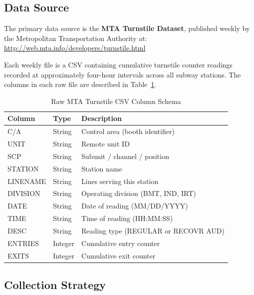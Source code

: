 
\subsection{Data Source}

The primary data source is the \textbf{MTA Turnstile Dataset}, published weekly
by the Metropolitan Transportation Authority at:
\url{http://web.mta.info/developers/turnstile.html}

Each weekly file is a CSV containing cumulative turnstile counter readings recorded
at approximately four-hour intervals across all subway stations. The columns in each
raw file are described in Table~\ref{tab:raw_schema}.

\begin{table}[H]
\centering
\caption{Raw MTA Turnstile CSV Column Schema}
\label{tab:raw_schema}
\begin{tabular}{@{}lll@{}}
\toprule
\textbf{Column} & \textbf{Type} & \textbf{Description} \\
\midrule
C/A        & String  & Control area (booth identifier) \\
UNIT       & String  & Remote unit ID \\
SCP        & String  & Subunit / channel / position \\
STATION    & String  & Station name \\
LINENAME   & String  & Lines serving this station \\
DIVISION   & String  & Operating division (BMT, IND, IRT) \\
DATE       & String  & Date of reading (MM/DD/YYYY) \\
TIME       & String  & Time of reading (HH:MM:SS) \\
DESC       & String  & Reading type (REGULAR or RECOVR AUD) \\
ENTRIES    & Integer & Cumulative entry counter \\
EXITS      & Integer & Cumulative exit counter \\
\bottomrule
\end{tabular}
\end{table}

\subsection{Collection Strategy}

